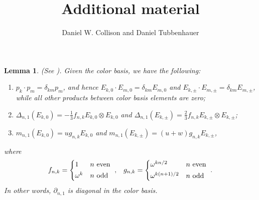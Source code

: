 \documentclass[a4paper,11pt]{amsart}
\newtheorem*{lemma}{Lemma}
\begin{document}
\title[Additional material]{Additional material}
\author[D. W. Collison and D. Tubbenhauer]{Daniel W. Collison and Daniel Tubbenhauer}

\address{D.W.C.: The University of Sydney, School of Mathematics and Statistics F07, NSW 2006, Australia}

\address{D.T.: The University of Sydney, School of Mathematics and Statistics F07, Office Carslaw 827, NSW 2006, Australia, \href{http://www.dtubbenhauer.com}{www.dtubbenhauer.com}, https://orcid.org/0000-0001-7265-5047}


\maketitle



\begin{lemma}\label{colorbasislem}
(See \cite[Lemma 6A.5]{penrose-cat}). Given the color basis, we have the following:
\begin{enumerate}
\item $p_k \cdot p_m = \delta_{km}p_m$, and hence $E_{k, 0} \cdot E_{m,0} = \delta_{km}E_{m, 0}$ and $E_{k, \pm} \cdot E_{m,\pm} = \delta_{km}E_{m, \pm}$, while all other products between color basis elements are zero;
\item $\Delta_{n, 1}(E_{k,0})= -\frac{1}{3} f_{n, k} E_{k,0} \otimes E_{k,0}$ and $\Delta_{n,1}(E_{k,\pm})= \frac{2}{3}f_{n,k} E_{k,\pm} \otimes E_{k,\pm}$;
\item $m_{n,1}(E_{k,0})= u g_{n,k}E_{k,0}$ and $m_{n,1}(E_{k,\pm})= (u+w) g_{n, k}E_{k,\pm}$,
\end{enumerate}
where 
\begin{align*}
f_{n, k} = \begin{cases*}
1 &  $n$ even \\
\omega^k &  $n$ odd
\end{cases*},
&  &
g_{n, k} = \begin{cases*}
\omega^{kn/2}&  $n$ even \\
\omega^{k(n+1)/2} &  $n$ odd
\end{cases*}.
\end{align*}
In other words, $\partial_{n,1}$ is diagonal in the color basis.
\end{lemma}
\end{document}
